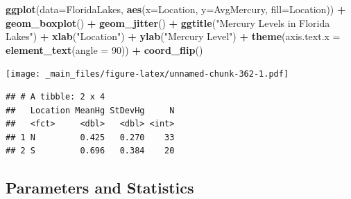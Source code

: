 \documentclass[]{book}
\newenvironment{Shaded}{\begin{snugshade}}{\end{snugshade}}
\newcommand{\KeywordTok}[1]{\textcolor[rgb]{0.13,0.29,0.53}{\textbf{#1}}}
\newcommand{\DataTypeTok}[1]{\textcolor[rgb]{0.13,0.29,0.53}{#1}}
\newcommand{\DecValTok}[1]{\textcolor[rgb]{0.00,0.00,0.81}{#1}}
\newcommand{\StringTok}[1]{\textcolor[rgb]{0.31,0.60,0.02}{#1}}
\newcommand{\OperatorTok}[1]{\textcolor[rgb]{0.81,0.36,0.00}{\textbf{#1}}}
\newcommand{\NormalTok}[1]{#1}
\begin{document}
\begin{Shaded}
\begin{Highlighting}[]
\KeywordTok{ggplot}\NormalTok{(}\DataTypeTok{data=}\NormalTok{FloridaLakes,  }\KeywordTok{aes}\NormalTok{(}\DataTypeTok{x=}\NormalTok{Location, }\DataTypeTok{y=}\NormalTok{AvgMercury, }\DataTypeTok{fill=}\NormalTok{Location)) }\OperatorTok{+}\StringTok{ }
\StringTok{  }\KeywordTok{geom_boxplot}\NormalTok{() }\OperatorTok{+}\StringTok{   }\KeywordTok{geom_jitter}\NormalTok{() }\OperatorTok{+}\StringTok{  }\KeywordTok{ggtitle}\NormalTok{(}\StringTok{"Mercury Levels in Florida Lakes"}\NormalTok{) }\OperatorTok{+}\StringTok{ }
\StringTok{  }\KeywordTok{xlab}\NormalTok{(}\StringTok{"Location"}\NormalTok{) }\OperatorTok{+}\StringTok{ }\KeywordTok{ylab}\NormalTok{(}\StringTok{"Mercury Level"}\NormalTok{) }\OperatorTok{+}\StringTok{  }\KeywordTok{theme}\NormalTok{(}\DataTypeTok{axis.text.x =} \KeywordTok{element_text}\NormalTok{(}\DataTypeTok{angle =} \DecValTok{90}\NormalTok{)) }\OperatorTok{+}\StringTok{ }\KeywordTok{coord_flip}\NormalTok{()}
\end{Highlighting}
\end{Shaded}

\texttt{[image: \_main\_files/figure-latex/unnamed-chunk-362-1.pdf]}

\begin{Shaded}
\end{Shaded}

\begin{verbatim}
## # A tibble: 2 x 4
##   Location MeanHg StDevHg     N
##   <fct>     <dbl>   <dbl> <int>
## 1 N         0.425   0.270    33
## 2 S         0.696   0.384    20
\end{verbatim}

\subsection{Parameters and Statistics}\label{parameters-and-statistics}
\end{document}
